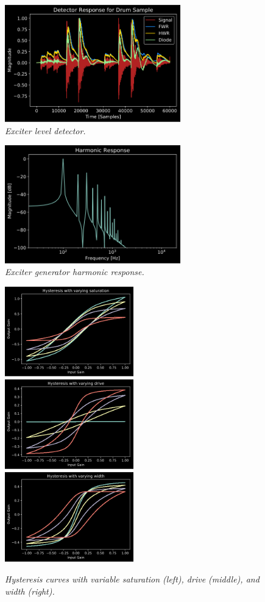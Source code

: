 \documentclass[twoside,a4paper]{article}
\begin{document}
%
\begin{figure}[!htb]
    \center
    \includegraphics[width=3in]{../Exciter/Pics/Waveform_Detected.png}
    \caption{\label{detect}{\it Exciter level detector.}}
\end{figure}
%
\begin{figure}[!htb]
    \center
    \includegraphics[width=3in]{../Exciter/Pics/exciter_harm.png}
    \caption{\label{exc-harm}{\it Exciter generator harmonic response.}}
\end{figure}
%
\begin{figure}[ht]
    \includegraphics[width=2.2in]{../Hysteresis/Pics/Saturations.png}
    \includegraphics[width=2.2in]{../Hysteresis/Pics/Drive.png}
    \includegraphics[width=2.2in]{../Hysteresis/Pics/Width.png}
    \caption{\label{hysteresis}{\it Hysteresis curves with variable saturation
    (left), drive (middle), and width (right).}}
\end{figure}
%
\end{document}
